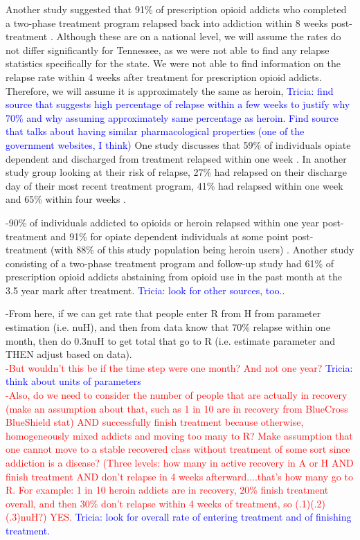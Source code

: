\documentclass[12pt]{article}
\begin{document}
Another study suggested that 91\% of prescription opioid addicts who completed a two-phase treatment program relapsed back into addiction within 8 weeks post-treatment \cite{Weiss}. Although these are on a national level, we will assume the rates do not differ significantly for Tennessee, as we were not able to find any relapse statistics specifically for the state. We were not able to find information on the relapse rate within 4 weeks after treatment for prescription opioid addicts. Therefore, we will assume it is approximately the same as heroin, \textcolor{blue}{Tricia: find source that suggests high percentage of relapse within a few weeks to justify why 70\% and why assuming approximately same percentage as heroin. Find source that talks about having similar pharmacological properties (one of the government websites, I think)} One study discusses that 59\% of individuals opiate dependent and discharged from treatment relapsed within one week \cite{Smyth}. In another study group looking at their risk of relapse, 27\% had relapsed on their discharge day of their most recent treatment program, 41\% had relapsed within one week and 65\% within four weeks \cite{Bailey}.

-90\% of individuals addicted to opioids or heroin relapsed within one year post-treatment and 91\% for opiate dependent individuals at some point post-treatment (with 88\% of this study population being heroin users) \cite{Bailey, Smyth}. Another study consisting of a two-phase treatment program and follow-up study had 61\% of prescription opioid addicts abstaining from opioid use in the past month at the 3.5 year mark after treatment. \textcolor{blue}{Tricia: look for other sources, too.}. 

-From here, if we can get rate that people enter R from H from parameter estimation (i.e. nuH), and then from data know that 70\% relapse within one month, then do 0.3nuH to get total that go to R  (i.e. estimate parameter and THEN adjust based on data).\\ 
\textcolor{red}{-But wouldn't this be if the time step were one month? And not one year? \textcolor{blue}{Tricia: think about units of parameters} \\
-Also, do we need to consider the number of people that are actually in recovery (make an assumption about that, such as 1 in 10 are in recovery from BlueCross BlueShield stat) AND successfully finish treatment because otherwise, homogeneously mixed addicts and moving too many to R? Make assumption that one cannot move to a stable recovered class without treatment of some sort since addiction is a disease? (Three levels: how many in active recovery in A or H AND finish treatment AND don't relapse in 4 weeks afterward....that's how many go to R. For example: 1 in 10 heroin addicts are in recovery, 20\% finish treatment overall, and then 30\% don't relapse within 4 weeks of treatment, so (.1)(.2)(.3)nuH?) YES.} \textcolor{blue}{Tricia: look for overall rate of entering treatment and of finishing treatment.\\}
\end{document}
